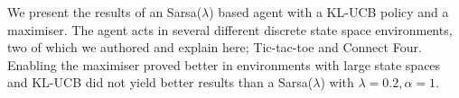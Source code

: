 We present the results of an Sarsa($\lambda$) based agent with a KL-UCB policy
and a maximiser. The agent acts in several different discrete state space
environments, two of which we authored and explain here; Tic-tac-toe and Connect
Four. Enabling the maximiser proved better in environments with large state
spaces and KL-UCB did not yield better results than a Sarsa($\lambda$) with $\lambda = 0.2, \alpha = 1$.
